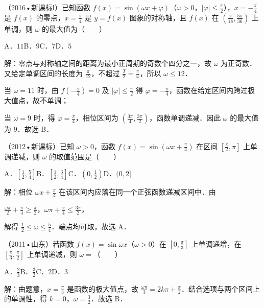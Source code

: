 \begin{question}
（2016•新课标Ⅰ）已知函数 $f(x)=\sin(\omega x+\varphi)$（$\omega>0$，$|\varphi|\leq\frac{\pi}{2}$），$x=-\frac{\pi}{4}$ 是 $f(x)$ 的零点，$x=\frac{\pi}{4}$ 是 $y=f(x)$ 图象的对称轴，且 $f(x)$ 在 $(\frac{\pi}{18},\frac{5\pi}{36})$ 上单调，则 $\omega$ 的最大值为（　　）\par A．$11$\qquad B．$9$\qquad C．$7$\qquad D．$5$\par
\begin{solution}
解：零点与对称轴之间的距离为最小正周期的奇数个四分之一，故 $\omega$ 为正奇数．又给定单调区间的长度为 $\frac{\pi}{12}$，不超过 $\frac{T}{2}=\frac{\pi}{\omega}$，所以 $\omega\leq12$．\par
当 $\omega=11$ 时，由 $f(-\frac{\pi}{4})=0$ 及 $|\varphi|\leq\frac{\pi}{2}$ 得 $\varphi=-\frac{\pi}{4}$，函数在给定区间内跨过极大值点，故不单调；\par
当 $\omega=9$ 时，得 $\varphi=\frac{\pi}{4}$，相位区间为 $(\frac{3\pi}{4},\frac{3\pi}{2})$，函数单调递减．因此 $\omega$ 的最大值为 $9$．故选 B．\par
\end{solution}
\end{question}

\begin{question}
（2012•新课标）已知 $\omega>0$，函数 $f(x)=\sin(\omega x+\frac{\pi}{4})$ 在区间 $[\frac{\pi}{2},\pi]$ 上单调递减，则 $\omega$ 的取值范围是（　　）\par
A．$[\frac12,\frac54]$\qquad B．$[\frac12,\frac34]$\qquad C．$(0,\frac12)$\qquad D．$(0,2]$\par
\begin{solution}
解：相位 $\omega x+\frac{\pi}{4}$ 在该区间内应落在同一个正弦函数递减区间中．由\par
$\frac{\omega\pi}{2}+\frac{\pi}{4}\geq\frac{\pi}{2}$，$\omega\pi+\frac{\pi}{4}\leq\frac{3\pi}{2}$，\par
解得 $\frac12\leq\omega\leq\frac54$．端点均可取，故选 A．\par
\end{solution}
\end{question}

\begin{question}
（2011•山东）若函数 $f(x)=\sin\omega x$（$\omega>0$）在 $[0,\frac{\pi}{3}]$ 上单调递增，在 $[\frac{\pi}{3},\frac{\pi}{2}]$ 上单调递减，则 $\omega=$（　　）\par
A．$\frac23$\qquad B．$\frac32$\qquad C．$2$\qquad D．$3$\par
\begin{solution}
解：由题意，$x=\frac{\pi}{3}$ 是函数的极大值点，故 $\frac{\omega\pi}{3}=2k\pi+\frac{\pi}{2}$．结合选项与两个区间上的单调性，得 $k=0$，$\omega=\frac32$．故选 B．\par
\end{solution}
\end{question}

